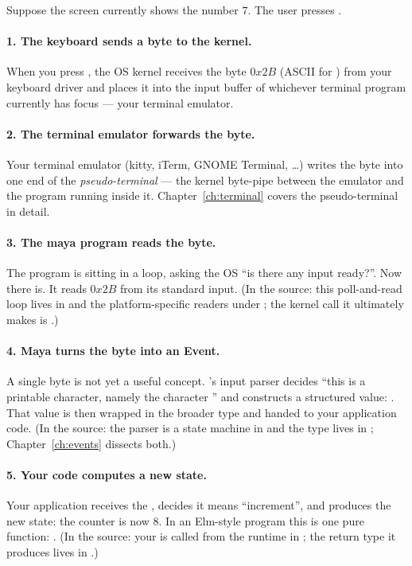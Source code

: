 Suppose the screen currently shows the number $7$. The user presses
\code{+}.

\paragraph{1. The keyboard sends a byte to the kernel.}
When you press \code{+}, the OS kernel receives the byte $0x2B$
(ASCII for \code{+}) from your keyboard driver and places it into
the input buffer of whichever terminal program currently has focus
--- your terminal emulator.

\paragraph{2. The terminal emulator forwards the byte.}
Your terminal emulator (kitty, iTerm, GNOME Terminal, \dots) writes
the byte into one end of the \emph{pseudo-terminal} --- the kernel
byte-pipe between the emulator and the program running inside it.
Chapter~\ref{ch:terminal} covers the pseudo-terminal in detail.

\paragraph{3. The maya program reads the byte.}
The \maya{} program is sitting in a loop, asking the OS ``is there
any input ready?''. Now there is. It reads $0x2B$ from its standard
input. (In the source: this poll-and-read loop lives in
 and the platform-specific
readers under ; the kernel call
it ultimately makes is .)

\paragraph{4. Maya turns the byte into an Event.}
A single byte is not yet a useful concept. \maya{}'s input parser
decides ``this is a printable character, namely the character
\code{+}'' and constructs a structured value: . That value is then wrapped in
the broader  type and handed to your application code.
(In the source: the parser is a state machine in
 and the  type
lives in ;
Chapter~\ref{ch:events} dissects both.)

\paragraph{5. Your code computes a new state.}
Your application receives the , decides it means
``increment'', and produces the new state: the counter is now $8$.
In an Elm-style \maya{} program this is one pure function:
. (In the source: your
 is called from the runtime in
; the  return
type it produces lives in .)

